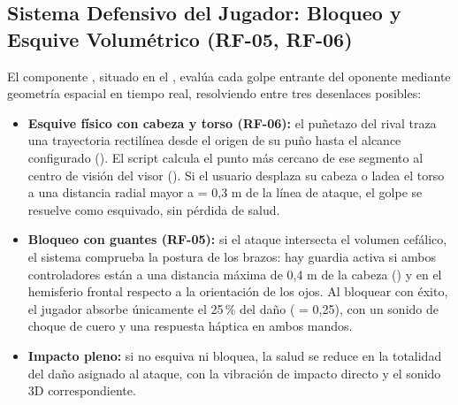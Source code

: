 \subsection{Sistema Defensivo del Jugador: Bloqueo y Esquive Volumétrico (RF-05, RF-06)}
El componente , situado en el , evalúa cada golpe entrante del oponente mediante geometría espacial en tiempo real, resolviendo entre tres desenlaces posibles:
\begin{itemize}
  \item \textbf{Esquive físico con cabeza y torso (RF-06):} el puñetazo del rival traza una trayectoria rectilínea desde el origen de su puño hasta el alcance configurado (). El script calcula el punto más cercano de ese segmento al centro de visión del visor (). Si el usuario desplaza su cabeza o ladea el torso a una distancia radial mayor a  = 0,3 m de la línea de ataque, el golpe se resuelve como esquivado, sin pérdida de salud.
  \item \textbf{Bloqueo con guantes (RF-05):} si el ataque intersecta el volumen cefálico, el sistema comprueba la postura de los brazos: hay guardia activa si ambos controladores están a una distancia máxima de 0,4 m de la cabeza () y en el hemisferio frontal respecto a la orientación de los ojos. Al bloquear con éxito, el jugador absorbe únicamente el 25\,\% del daño ( = 0,25), con un sonido de choque de cuero y una respuesta háptica en ambos mandos.
  \item \textbf{Impacto pleno:} si no esquiva ni bloquea, la salud se reduce en la totalidad del daño asignado al ataque, con la vibración de impacto directo y el sonido 3D correspondiente.
\end{itemize}

